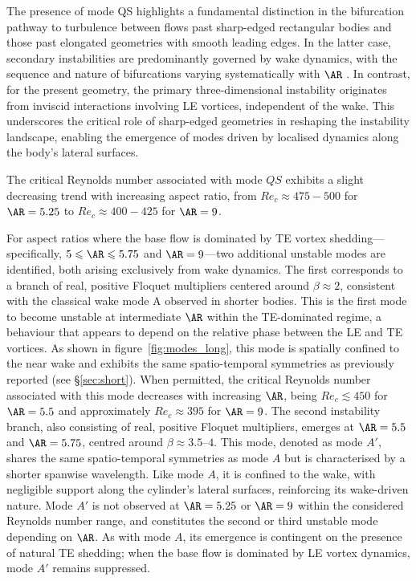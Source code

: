 The presence of mode QS highlights a fundamental distinction in the bifurcation pathway to turbulence between flows past sharp-edged rectangular bodies and those past elongated geometries with smooth leading edges. In the latter case, secondary instabilities are predominantly governed by wake dynamics, with the sequence and nature of bifurcations varying systematically with $\AR$ \citep{ryan-thompson-hourigan-2005}. In contrast, for the present geometry, the primary three-dimensional instability originates from inviscid interactions involving LE vortices, independent of the wake. This underscores the critical role of sharp-edged geometries in reshaping the instability landscape, enabling the emergence of modes driven by localised dynamics along the body’s lateral surfaces.

The critical Reynolds number associated with mode $QS$ exhibits a slight decreasing trend with increasing aspect ratio, from $Re_c \approx 475-500$ for $\AR=5.25$ to $Re_c \approx 400-425$ for $\AR=9$. 

For aspect ratios where the base flow is dominated by TE vortex shedding---specifically, $5 \le \AR \le 5.75$ and $\AR = 9$---two additional unstable modes are identified, both arising exclusively from wake dynamics. The first corresponds to a branch of real, positive Floquet multipliers centered around $\beta \approx 2$, consistent with the classical wake mode A observed in shorter bodies. This is the first mode to become unstable at intermediate $\AR$ within the TE-dominated regime, a behaviour that appears to depend on the relative phase between the LE and TE vortices. As shown in figure~\ref{fig:modes_long}, this mode is spatially confined to the near wake and exhibits the same spatio-temporal symmetries as previously reported (see \S\ref{sec:short}). When permitted, the critical Reynolds number associated with this mode decreases with increasing $\AR$, being $Re_c \lesssim 450$ for $\AR = 5.5$ and approximately $Re_c \approx 395$ for $\AR = 9$.
%
The second instability branch, also consisting of real, positive Floquet multipliers, emerges at $\AR = 5.5$ and $\AR = 5.75$, centred around $\beta \approx 3.5$–$4$. This mode, denoted as mode $A'$, shares the same spatio-temporal symmetries as mode $A$ but is characterised by a shorter spanwise wavelength. Like mode $A$, it is confined to the wake, with negligible support along the cylinder’s lateral surfaces, reinforcing its wake-driven nature. Mode $A'$ is not observed at $\AR = 5.25$ or $\AR = 9$ within the considered Reynolds number range, and constitutes the second or third unstable mode depending on $\AR$. As with mode $A$, its emergence is contingent on the presence of natural TE shedding; when the base flow is dominated by LE vortex dynamics, mode $A'$ remains suppressed.

